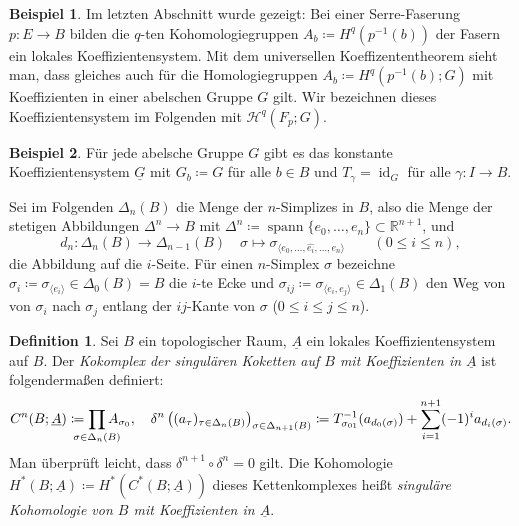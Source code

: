 \documentclass[11pt, a4paper, german]{article}
\theoremstyle{definition}
\newtheorem{bsp}{Beispiel}
\newtheorem{defn}{Definition}
\theoremstyle{remark}
\newcommand{\R}{\mathbb{R}} %
\DeclareMathOperator{\id}{id} %
\DeclareMathOperator{\spann}{spann} %
\newcommand{\angles}[1]{{\langle #1 \rangle}}
\newcommand{\LH}{\mathcal{H}} %
\begin{document}
\begin{bsp}
  Im letzten Abschnitt wurde gezeigt: Bei einer Serre-Faserung $p : E \to B$ bilden die $q$-ten Kohomologiegruppen $A_b \coloneqq H^q(p^{-1}(b))$ der Fasern ein lokales Koeffizientensystem.
  Mit dem universellen Koeffizententheorem sieht man, dass gleiches auch für die Homologiegruppen $A_b \coloneqq H^q(p^{-1}(b); G)$ mit Koeffizienten in einer abelschen Gruppe $G$ gilt.
  Wir bezeichnen dieses Koeffizientensystem im Folgenden mit $\LH^q(F_p; G)$. %
\end{bsp}

\begin{bsp}
  Für jede abelsche Gruppe $G$ gibt es das konstante Koeffizientensystem $\underline{G}$ mit $G_b \coloneqq G$ für alle $b \in B$ und $T_\gamma = \id_G$ für alle $\gamma : I \to B$.
\end{bsp}

Sei im Folgenden $\Delta_n(B)$ die Menge der $n$-Simplizes in $B$, also die Menge der stetigen Abbildungen $\Delta^n \to B$ mit $\Delta^n \coloneqq \spann \{ e_0, \ldots, e_n \} \subset \R^{n+1}$, und
\[
  d_n : \Delta_n(B) \to \Delta_{n-1}(B) \quad
  \sigma \mapsto \sigma_{\angles{e_0, \ldots, \hat{e_i}, \ldots, e_n}} \qquad (0 \leq i \leq n),
\]
die Abbildung auf die $i$-Seite. %
Für einen $n$-Simplex $\sigma$ bezeichne $\sigma_i \coloneqq \sigma_{\angles{e_i}} \in \Delta_0(B) = B$ die $i$-te Ecke und $\sigma_{ij} \coloneqq \sigma_{\angles{e_i, e_j}} \in \Delta_1(B)$ den Weg von von $\sigma_i$ nach $\sigma_j$ entlang der $ij$-Kante von $\sigma$ ($0 \leq i \leq j \leq n$).

\begin{defn}
  Sei $B$ ein topologischer Raum, $\underline{A}$ ein lokales Koeffizientensystem auf $B$.
  Der \emph{Kokomplex der singulären Koketten auf $B$ mit Koeffizienten in $\underline{A}$} ist folgendermaßen definiert:
  \[
    C^n(B; \underline{A}) \coloneqq \prod_{\mathclap{\sigma \in \Delta_n(B)}} A_{\sigma_0}, \quad
    \delta^n\left((a_\tau)_{\tau \in \Delta_n(B)}\right)_{\sigma \in \Delta_{n+1}(B)} \coloneqq T_{\sigma_{01}}^{-1}(a_{d_0(\sigma)}) + \sum_{i=1}^{n+1} (-1)^i a_{d_i(\sigma)}.
  \]
  Man überprüft leicht, dass $\delta^{n+1} \circ \delta^n = 0$ gilt.
  Die Kohomologie $H^*(B; \underline{A}) \coloneqq H^*(C^*(B; \underline{A}))$ dieses Kettenkomplexes heißt \emph{singuläre Kohomologie von $B$ mit Koeffizienten in $\underline{A}$}.
\end{defn}
\end{document}
